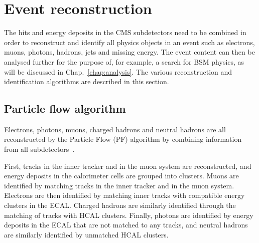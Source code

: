 \section{Event reconstruction}
\label{sec:detector-reconstruction}

The hits and energy deposits in the CMS subdetectors need to be combined in 
order to reconstruct and identify all physics objects in an event such as 
electrons, muons, photons, hadrons, jets and missing energy. The event content 
can then be analysed further for the purpose of, for example, a search for BSM 
physics, as will be discussed in Chap.~\ref{chap:analysis}. The various 
reconstruction and identification algorithms are described in this section.

\subsection{Particle flow algorithm}
Electrons, photons, muons, charged hadrons and neutral hadrons are all 
reconstructed by the Particle Flow (PF) algorithm by combining information from 
all subdetectors~\cite{particleflow17}. 

First, tracks in the inner tracker and 
in the muon system are reconstructed, and energy deposits in the calorimeter 
cells are grouped into clusters. Muons are identified by matching tracks in the 
inner tracker and in the muon system. 
Electrons are then identified by matching inner tracks with compatible energy 
clusters in the ECAL. Charged hadrons are similarly identified through the 
matching of tracks with HCAL clusters.
Finally, photons are identified by energy deposits in the ECAL that are not 
matched to any tracks, and neutral hadrons are similarly identified by 
unmatched HCAL clusters.

